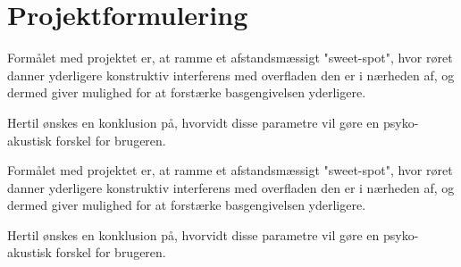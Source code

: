 \chapter{Projektformulering}

Formålet med projektet er, at ramme et afstandsmæssigt "sweet-spot", hvor røret danner yderligere konstruktiv interferens med overfladen den er i nærheden af, og dermed giver mulighed for at forstærke basgengivelsen yderligere. 

Hertil ønskes en konklusion på, hvorvidt disse parametre vil gøre en psyko-akustisk forskel for brugeren. 


Formålet med projektet er, at ramme et afstandsmæssigt "sweet-spot", hvor røret danner yderligere konstruktiv interferens med overfladen den er i nærheden af, og dermed giver mulighed for at forstærke basgengivelsen yderligere. 

Hertil ønskes en konklusion på, hvorvidt disse parametre vil gøre en psyko-akustisk forskel for brugeren. 

